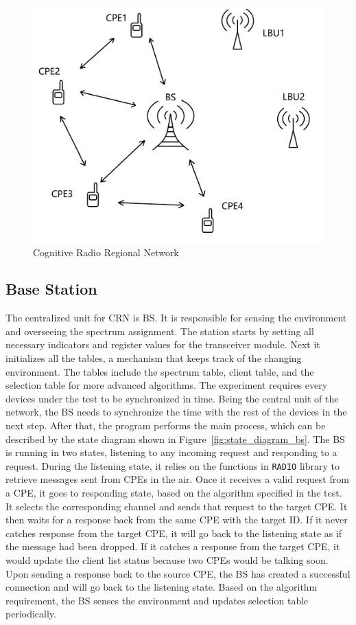 \begin{figure}[ht]
\centering
\includegraphics[width=14cm]{figures/network.png}
\caption{Cognitive Radio Regional Network}
\label{fig:network}
\end{figure}

\subsection{Base Station}

The centralized unit for CRN is BS. It is responsible for sensing the environment and overseeing the spectrum assignment. The station starts by setting all necessary indicators and register values for the transceiver module. Next it initializes all the tables, a mechanism that keeps track of the changing environment. The tables include the spectrum table, client table, and the selection table for more advanced algorithms. The experiment requires every devices under the test to be synchronized in time. Being the central unit of the network, the BS needs to synchronize the time with the rest of the devices in the next step. After that, the program performs the main process, which can be described by the state diagram shown in Figure~\ref{fig:state_diagram_bs}. The BS is running in two states, listening to any incoming request and responding to a request. During the listening state, it relies on the functions in \texttt{RADIO} library to retrieve messages sent from CPEs in the air. Once it receives a valid request from a CPE, it goes to responding state, based on the algorithm specified in the test. It selects the corresponding channel and sends that request to the target CPE. It then waits for a response back from the same CPE with the target ID. If it never catches response from the target CPE, it will go back to the listening state as if the message had been dropped. If it catches a response from the target CPE, it would update the client list status because two CPEs would be talking soon. Upon sending a response back to the source CPE, the BS has created a successful connection and will go back to the listening state. Based on the algorithm requirement, the BS senses the environment and updates selection table periodically.

